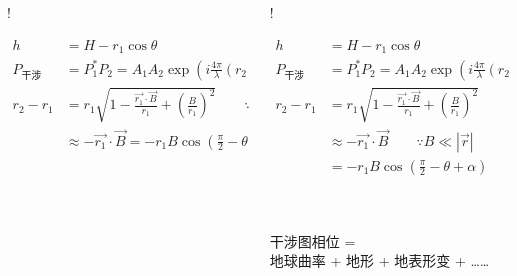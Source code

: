 \documentclass{beamer}
\begin{document}
\begin{frame}
\begin{columns}
\begin{column}{0.5\textwidth}
             {!} {
                \begin{minipage}{\linewidth}
                \begin{align*}
                    h &= H - r_1 \cos\theta \\
                    P_{\textrm{干涉}} &= P_1^* P_2 =  A_1 A_2 \exp(i \frac{4\pi}{\lambda}(r_2 - r_1)) \\
                    r_2 - r_1 &= r_1 \sqrt{1- \frac{\vec{r_1} \cdot \vec{B}}{r_1} + (\frac{B}{r_1})^2} \qquad \because B \ll |\vec{r}| \\
                              &\approx - \vec{r_1} \cdot \vec{B}
                              = - r_1 B \cos(\frac{\pi}{2} - \theta + \alpha)
                \end{align*}
                \end{minipage}
            }
        \end{column}
        \begin{column}{0.5\textwidth}
            \footnotesize
             {!} {
                \begin{minipage}{\linewidth}
                \begin{align*}
                    h &= H - r_1 \cos\theta \\
                    P_{\textrm{干涉}} &= P_1^* P_2 =  A_1 A_2 \exp(i \frac{4\pi}{\lambda}(r_2 - r_1)) \\
                    r_2 - r_1 &= r_1 \sqrt{1- \frac{\vec{r_1} \cdot \vec{B}}{r_1} + (\frac{B}{r_1})^2} \\
                              &\approx - \vec{r_1} \cdot \vec{B} \qquad \because B \ll |\vec{r}| \\
                              &= - r_1 B \cos(\frac{\pi}{2} - \theta + \alpha)
                \end{align*}
                \end{minipage}
            }

            ~\\~\\
            干涉图相位 = \\
            地球曲率 + 地形 + 地表形变 + ……
        \end{column}
    \end{columns}
\end{frame}
\end{document}
